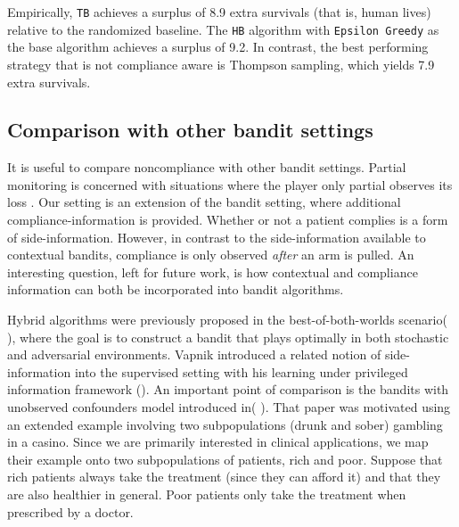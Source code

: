 Empirically, \texttt{TB} achieves a surplus of 8.9 extra survivals (that is, human lives) relative to the randomized baseline.
The \texttt{HB} algorithm with \texttt{Epsilon Greedy} as the base algorithm achieves a surplus of 9.2.
In contrast, the best performing strategy that is not compliance aware is Thompson sampling, which yields 7.9 extra survivals.



\subsection{Comparison with other bandit settings}
It is useful to compare noncompliance with other bandit settings. Partial monitoring is concerned with situations where the player only partial observes its loss \cite{alon:15}. Our setting is an extension of the bandit setting, where additional compliance-information is provided. Whether or not a patient complies is a form of side-information. However, in contrast to the side-information available to contextual bandits, compliance is only observed \emph{after} an arm is pulled. An interesting question, left for future work, is how contextual and compliance information can both be incorporated into bandit algorithms.

Hybrid algorithms were previously proposed in the best-of-both-worlds scenario( \cite{bubeck:12a,seldin:14}), where the goal is to construct a bandit that plays optimally in both stochastic and adversarial environments. Vapnik introduced a related notion of side-information into the supervised setting with his learning under privileged information framework (\cite{vapnik:09}). 
An important point of comparison is the bandits with unobserved confounders model introduced in( \cite{bareinboim:15}). That paper was motivated using an extended example involving two subpopulations (drunk and sober) gambling in a casino. Since we are primarily interested in clinical applications, we map their example onto two subpopulations of patients, rich and poor. Suppose that rich patients always take the treatment (since they can afford it) and that they are also healthier in general. Poor patients only take the treatment when prescribed by a doctor.

